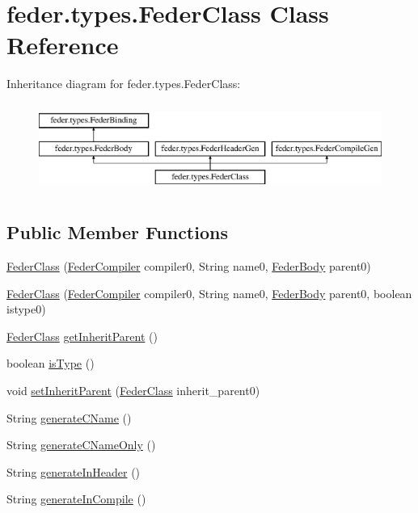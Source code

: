 \hypertarget{classfeder_1_1types_1_1FederClass}{}\section{feder.\+types.\+Feder\+Class Class Reference}
\label{classfeder_1_1types_1_1FederClass}
Inheritance diagram for feder.\+types.\+Feder\+Class\+:\begin{figure}[H]
\begin{center}
\leavevmode
\includegraphics[height=2.947368cm]{classfeder_1_1types_1_1FederClass}
\end{center}
\end{figure}
\subsection*{Public Member Functions}
\begin{DoxyCompactItemize}
\item 
\hyperlink{classfeder_1_1types_1_1FederClass_a6599d0085106c898b54f1d0586e24931}{Feder\+Class} (\hyperlink{classfeder_1_1FederCompiler}{Feder\+Compiler} compiler0, String name0, \hyperlink{classfeder_1_1types_1_1FederBody}{Feder\+Body} parent0)
\item 
\hyperlink{classfeder_1_1types_1_1FederClass_a597983dcbbfd20a2cb51c8e77a010905}{Feder\+Class} (\hyperlink{classfeder_1_1FederCompiler}{Feder\+Compiler} compiler0, String name0, \hyperlink{classfeder_1_1types_1_1FederBody}{Feder\+Body} parent0, boolean istype0)
\item 
\hyperlink{classfeder_1_1types_1_1FederClass}{Feder\+Class} \hyperlink{classfeder_1_1types_1_1FederClass_a33ee88c8e95095a0b1b0e53f1429149f}{get\+Inherit\+Parent} ()
\item 
boolean \hyperlink{classfeder_1_1types_1_1FederClass_a6f23b3ce236b6d4568226e0d73f57601}{is\+Type} ()
\item 
void \hyperlink{classfeder_1_1types_1_1FederClass_abb3f629d1d752c6f6a207f12d2bc715e}{set\+Inherit\+Parent} (\hyperlink{classfeder_1_1types_1_1FederClass}{Feder\+Class} inherit\+\_\+parent0)
\item 
String \hyperlink{classfeder_1_1types_1_1FederClass_af8a297a2144969b497d053771c855088}{generate\+C\+Name} ()
\item 
String \hyperlink{classfeder_1_1types_1_1FederClass_a8cdb0ce97458df81ac91636799b5049f}{generate\+C\+Name\+Only} ()
\item 
String \hyperlink{classfeder_1_1types_1_1FederClass_a13b9740438b256dba8be6e63c8a1cc88}{generate\+In\+Header} ()
\item 
String \hyperlink{classfeder_1_1types_1_1FederClass_a4e57f61fe5a5c561e12af11da1e8f37b}{generate\+In\+Compile} ()
\end{DoxyCompactItemize}
